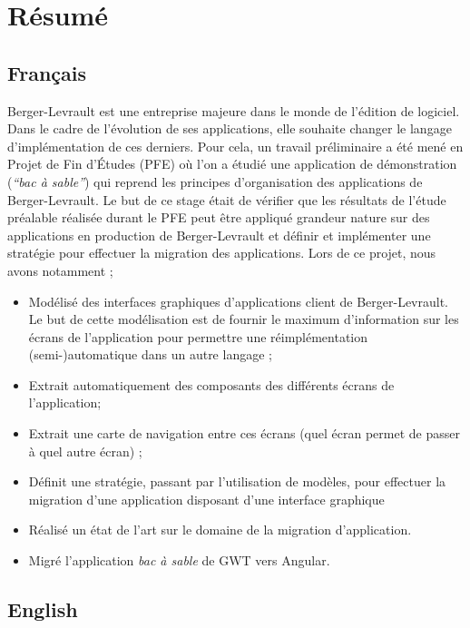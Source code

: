\hypertarget{ruxe9sumuxe9}{%
\section{Résumé}\label{ruxe9sumuxe9}}

\hypertarget{franuxe7ais}{%
\subsection{Français}\label{franuxe7ais}}

Berger-Levrault est une entreprise majeure dans le monde de l'édition de
logiciel. Dans le cadre de l'évolution de ses applications, elle
souhaite changer le langage d'implémentation de ces derniers. Pour cela,
un travail préliminaire a été mené en Projet de Fin d'Études (PFE) où
l'on a étudié une application de démonstration (\emph{``bac à sable''})
qui reprend les principes d'organisation des applications de
Berger-Levrault. Le but de ce stage était de vérifier que les résultats
de l'étude préalable réalisée durant le PFE peut être appliqué grandeur
nature sur des applications en production de Berger-Levrault et définir
et implémenter une stratégie pour effectuer la migration des
applications. Lors de ce projet, nous avons notamment ;

\begin{itemize}
\tightlist
\item
  Modélisé des interfaces graphiques d'applications client de
  Berger-Levrault. Le but de cette modélisation est de fournir le
  maximum d'information sur les écrans de l'application pour permettre
  une réimplémentation (semi-)automatique dans un autre langage ;
\item
  Extrait automatiquement des composants des différents écrans de
  l'application;
\item
  Extrait une carte de navigation entre ces écrans (quel écran permet de
  passer à quel autre écran) ;
\item
  Définit une stratégie, passant par l'utilisation de modèles, pour
  effectuer la migration d'une application disposant d'une interface
  graphique
\item
  Réalisé un état de l'art sur le domaine de la migration d'application.
\item
  Migré l'application \emph{bac à sable} de GWT vers Angular.
\end{itemize}

\hypertarget{english}{%
\subsection{English}\label{english}}
